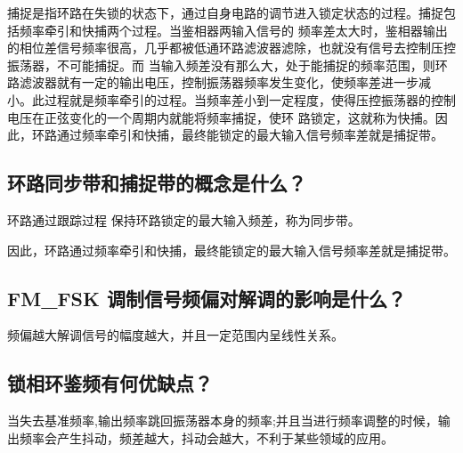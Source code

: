 \documentclass{../source/Experiment}
\begin{document}
        捕捉是指环路在失锁的状态下，通过自身电路的调节进入锁定状态的过程。捕捉包括频率牵引和快捕两个过程。当鉴相器两输入信号的
        频率差太大时，鉴相器输出的相位差信号频率很高，几乎都被低通环路滤波器滤除，也就没有信号去控制压控振荡器，不可能捕捉。而
        当输入频差没有那么大，处于能捕捉的频率范围，则环路滤波器就有一定的输出电压，控制振荡器频率发生变化，使频率差进一步减
        小。此过程就是频率牵引的过程。当频率差小到一定程度，使得压控振荡器的控制电压在正弦变化的一个周期内就能将频率捕捉，使环
        路锁定，这就称为快捕。因此，环路通过频率牵引和快捕，最终能锁定的最大输入信号频率差就是捕捉带。
        
        \subsection{环路同步带和捕捉带的概念是什么？}
        环路通过跟踪过程
        保持环路锁定的最大输入频差，称为同步带。

        因此，环路通过频率牵引和快捕，最终能锁定的最大输入信号频率差就是捕捉带。
        \subsection{FM\_FSK 调制信号频偏对解调的影响是什么？}
        频偏越大解调信号的幅度越大，并且一定范围内呈线性关系。
        \subsection{锁相环鉴频有何优缺点？}
        当失去基准频率,输出频率跳回振荡器本身的频率;并且当进行频率调整的时候，输出频率会产生抖动，频差越大，抖动会越大，不利于某些领域的应用。
\end{document}
